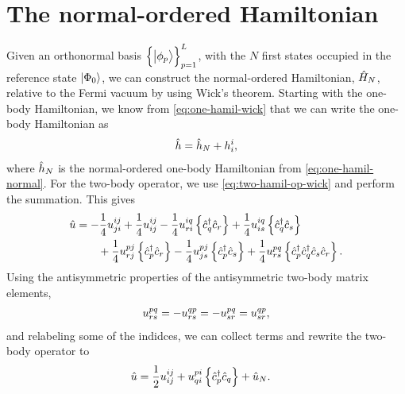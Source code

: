     \section{The normal-ordered Hamiltonian}
        Given an orthonormal basis $\left\{ \ket{\phi_p} \right\}_{p = 1}^{L}$, with the
        $N$ first states occupied in the reference state $\ket{\Phi_{0}}$, we
        can construct the normal-ordered Hamiltonian, $\hat{H}_N$, relative to
        the Fermi vacuum by using Wick's theorem.
        Starting with the one-body Hamiltonian, we know from
        \autoref{eq:one-hamil-wick} that we can write the one-body Hamiltonian
        as
        \begin{align}
            \hat{h} = \hat{h}_N + h^{i}_{i},
        \end{align}
        where $\hat{h}_N$ is the normal-ordered one-body Hamiltonian from
        \autoref{eq:one-hamil-normal}.
        For the two-body operator, we use \autoref{eq:two-hamil-op-wick} and
        perform the summation.
        This gives
        \begin{align}
            \hat{u}
            &=
            - \frac{1}{4}u^{ij}_{ji}
            + \frac{1}{4}u^{ij}_{ij}
            - \frac{1}{4}u^{iq}_{ri}\left\{ 
                \hat{c}_{q}^{\dagger}
                \hat{c}_{r}
             \right\}
            + \frac{1}{4}u^{iq}_{is}\left\{ 
                \hat{c}_{q}^{\dagger}
                \hat{c}_{s}
             \right\}
            \nonumber \\
            &\qquad
            + \frac{1}{4}u^{pj}_{rj}\left\{ 
                \hat{c}_{p}^{\dagger}
                \hat{c}_{r}
             \right\}
            - \frac{1}{4}u^{pj}_{js}\left\{ 
                \hat{c}_{p}^{\dagger}
                \hat{c}_{s}
             \right\}
            + \frac{1}{4}u^{pq}_{rs}\left\{ 
                \hat{c}_{p}^{\dagger}
                \hat{c}_{q}^{\dagger}
                \hat{c}_{s}
                \hat{c}_{r}
             \right\}.
        \end{align}
        Using the antisymmetric properties of the antisymmetric two-body
        matrix elements,
        \begin{align}
            u^{pq}_{rs}
            =
            -u^{qp}_{rs}
            =
            -u^{pq}_{sr}
            =
            u^{qp}_{sr},
        \end{align}
        and relabeling some of the indidces, we can collect terms and rewrite
        the two-body operator to
        \begin{align}
            \hat{u}
            &=
            \frac{1}{2} u^{ij}_{ij}
            + u^{pi}_{qi}\left\{ 
                \hat{c}_{p}^{\dagger}
                \hat{c}_{q}
             \right\}
            + \hat{u}_N.
        \end{align}

